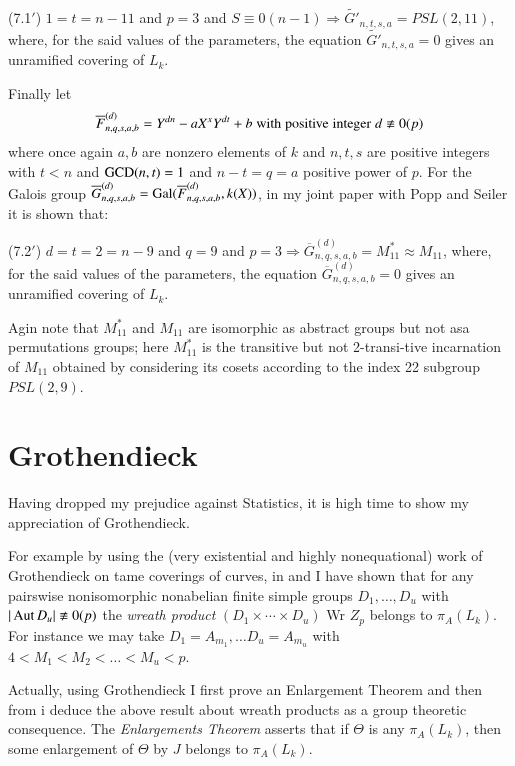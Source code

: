 (7.1$'$) $1=t=n-11$ and $p=3$ and $S\equiv 0(n-1) \Rightarrow \widetilde{G'}_{n,t,s,a} = PSL(2,11)$, where, for the said values of the parameters, the equation $ \widetilde{G'}_{n,t,s,a}=0$ gives an unramified covering of $L_{k}$.

Finally let
$$
\overline{F}^{(d)}_{n,q,s,a,b} = Y^{dn}-aX^{x}Y^{dt} + b\; {\rm with\; positive\; integer}\; d\nequiv 0(p)
$$ 
where once again $a,b$ are nonzero elements of $k$ and $n,t,s$ are positive integers with $t<n$ and $\operatorname{GCD}(n,t)=1$ and
$n-t=q=a$ positive power of $p$. For the Galois group $\overline{G}^{(d)}_{n,q,s,a,b} = \operatorname{Gal}(\overline{F}^{(d)}_{n,q,s,a,b}, k(X))$, in my joint paper \cite{art1-key15} with Popp and Seiler it is shown that:

(7.2$'$) $d=t=2=n-9$ and $q=9$ and $p=3 \Rightarrow \overline{G}^{(d)}_{n,q,s,a,b} =M^{*}_{11}\approx M_{11}$, where, for the said values of the parameters, the equation  $\overline{G}^{(d)}_{n,q,s,a,b} = 0$ gives an unramified covering of $L_{k}$.

Agin note that $M^{*}_{11}$ and $M_{11}$ are isomorphic as abstract groups but not asa permutations groups; here $M^{*}_{11}$ is the transitive but not 2-transi-\break tive incarnation of $M_{11}$ obtained by considering its cosets according to the index 22 subgroup $PSL(2,9)$.

\section{Grothendieck}

Having dropped my prejudice against Statistics, it is high time to show my appreciation of Grothendieck.

For example by using the (very existential and highly nonequational) work of Grothendieck \cite{art1-key33} on tame coverings of curves, in \cite{art1-key7} and \cite{art1-key11} I have shown that for any pairswise nonisomorphic nonabelian finite simple groups $D_{1},\ldots, D_{u}$ with $|\Aut D_{u}| \nequiv 0(p)$ the \textit{wreath product} $(D_{1}\times\cdots\times D_{u})$ Wr $Z_{p}$ belongs to $\pi_{A}(L_{k})$. For instance we may take $D_{1}= A_{m_{1}}, \ldots D_{u} =A_{m_{u}}$ with $4 < M_{1} < M_{2} < \ldots < M_{u} < p$. 

Actually, using Grothendieck \cite{art1-key33} I first prove an Enlargement Theorem and then from i deduce the above result about wreath products as a group theoretic consequence. The \textit{Enlargements Theorem} asserts that if $\Theta$ is any $\pi_{A}(L_{k})$, then some enlargement of $\Theta$ by $J$ belongs to $\pi_{A}(L_{k})$. 

